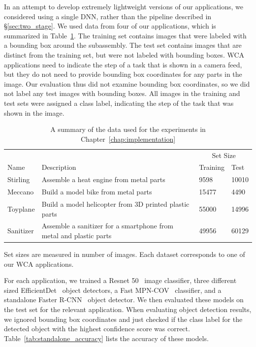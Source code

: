 In an attempt to develop extremely lightweight versions of our applications,
we considered using a single DNN, rather than the pipeline described in
\S\ref{sec:two_stage}.
We used data from four of our applications, which is summarized in
Table~\ref{tab:dataset_size}.
The training set contains images that were labeled with a bounding box around
the subassembly.
The test set contains images that are distinct from the training set, but were
not labeled with bounding boxes.
WCA applications need to indicate the step of a task that is shown in a camera
feed, but they do not need to provide bounding box coordinates for any parts
in the image.
Our evaluation thus did not examine bounding box coordinates, so we did not
label any test images with bounding boxes.
All images in the training and test sets were assigned a class label, indicating
the step of the task that was shown in the image.

\begin{table}
\begin{tabular}{|l||p{10.5cm}|l|l|}
  \hline
  & & \multicolumn{2}{c|}{Set Size}\\
  Name & Description & Training & Test \\
  \hline
  \hline
  Stirling & Assemble a heat engine from metal parts & 9598 & 10010\\
  Meccano & Build a model bike from metal parts & 15477 & 4490\\
  Toyplane & Build a model helicopter from 3D printed plastic parts & 55000 & 14996\\
  Sanitizer & Assemble a sanitizer for a smartphone from metal and plastic parts & 49956 & 60129\\
  \hline
\end{tabular}
\begin{captiontext}
    Set sizes are measured in number of images.
    Each dataset corresponds to one of our WCA applications.
  \end{captiontext}
  \caption{
    A summary of the data used for the experiments in
    Chapter~\ref{chap:implementation}
  }\label{tab:dataset_size}
\end{table}

For each application, we trained a Resnet 50~\cite{He2016} image classifier,
three different sized EfficientDet~\cite{Tan2020} object detectors, a
Fast MPN-COV~\cite{Li_2018_CVPR} classifier, and a standalone Faster
R-CNN~\cite{frcnn} object detector.
We then evaluated these models on the test set for the relevant application.
When evaluating object detection results, we ignored bounding box coordinates
and just checked if the class label for the detected object with the highest
confidence score was correct.
Table~\ref{tab:standalone_accuracy} lists the accuracy of these models.

